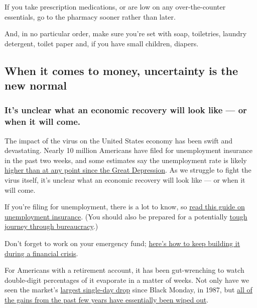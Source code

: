 If you take prescription medications, or are low on any over-the-counter
essentials, go to the pharmacy sooner rather than later.

And, in no particular order, make sure you're set with soap, toiletries,
laundry detergent, toilet paper and, if you have small children,
diapers.

\hypertarget{when-it-comes-to-money-uncertainty-is-the-new-normal}{%
\subsection{When it comes to money, uncertainty is the new
normal}\label{when-it-comes-to-money-uncertainty-is-the-new-normal}}

\hypertarget{its-unclear-what-an-economic-recovery-will-look-like--or-when-it-will-come}{%
\subsubsection{It's unclear what an economic recovery will look like ---
or when it will
come.}\label{its-unclear-what-an-economic-recovery-will-look-like--or-when-it-will-come}}

The impact of the virus on the United States economy has been swift and
devastating. Nearly 10 million Americans have filed for unemployment
insurance in the past two weeks, and some estimates say the unemployment
rate is likely
\href{https://www.nytimes3xbfgragh.onion/2020/04/03/upshot/coronavirus-jobless-rate-great-depression.html}{higher
than at any point since the Great Depression}. As we struggle to fight
the virus itself, it's unclear what an economic recovery will look like
--- or when it will come.

If you're filing for unemployment, there is a lot to know, so
\href{https://www.nytimes3xbfgragh.onion/2020/03/17/your-money/unemployment-insurance-coronavirus.html}{read
this guide on unemployment insurance}. (You should also be prepared for
a potentially
\href{https://www.nytimes3xbfgragh.onion/2020/04/04/nyregion/coronavirus-ny-unemployment-benefits.html}{tough
journey through bureaucracy}.)

Don't forget to work on your emergency fund;
\href{https://www.nytimes3xbfgragh.onion/2020/03/20/your-money/coronavirus-emergency-fund.html}{here's
how to keep building it during a financial crisis}.

For Americans with a retirement account, it has been gut-wrenching to
watch double-digit percentages of it evaporate in a matter of weeks. Not
only have we seen the market's
\href{https://www.nytimes3xbfgragh.onion/2020/03/16/business/stock-market-drops-recap.html\#link-7c85d039}{largest
single-day drop} since Black Monday, in 1987, but
\href{https://www.nytimes3xbfgragh.onion/2020/03/20/business/coronavirus-trump-stock-market.html}{all
of the gains from the past few years have essentially been wiped out}.

